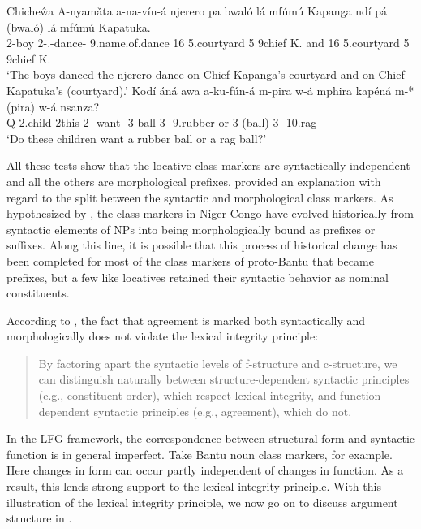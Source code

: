 \documentclass[output=paper,hidelinks]{langscibook}
\begin{document}
\ea\label{ex:African:12} Chiche\^wa
\ea
    \gll  A-nyamǎta a-na-vín-á njerero pa bwaló lá mfúmú Kapanga ndí
    pá (bwaló) lá mfúmú Kapatuka. \\
     2-boy            2{\SBJ}-{.\PST}-dance-{\IND}  9.name.of.dance
         16  5.courtyard 5 9chief     K.            and  16 5.courtyard
         5 9chief     K.   \\
    \glt ‘The boys danced the njerero dance on Chief Kapanga’s  courtyard and on Chief Kapatuka’s (courtyard).’
\ex
    \gll *Kodí áná awa a-ku-fún-á m-pira w-á mphira kapéná m-*(pira)
    w-á nsanza?\\
       Q      2.child   2this  2{\SBJ}-{\PROG}-want-{\IND}  3-ball    3-
            9.rubber or          3-(ball)      3- 10.rag \\
    \glt ‘Do these children want a rubber ball or a rag ball?’
\z
\z

All these tests show that the locative class markers are syntactically independent and all the others are morphological prefixes. \citet{bresnan1995the-lexical} provided an explanation with regard to the split between the syntactic and morphological class markers. As hypothesized by \citet{Greenberg1977,Greenberg:Gender}, the class markers in Niger-Congo have evolved historically from syntactic elements of NPs into being morphologically bound as prefixes or suffixes. Along this line, it is possible that this process of historical change has been completed for most of the class markers of proto-Bantu that became prefixes, but a few like locatives retained their syntactic behavior as nominal constituents. 

According to \citet{bresnan1995the-lexical}, the fact that agreement is marked both syntactically and morphologically does not violate the lexical integrity principle:

\begin{quote}
By factoring apart the syntactic levels of f-structure and c-structure, we can distinguish naturally between structure-dependent syntactic principles (e.g., constituent order), which respect lexical integrity, and function-depen\-dent syntactic principles (e.g., agreement), which do not. \citep[213]{bresnan1995the-lexical}
\end{quote}

In the LFG framework, the correspondence between structural form and syntactic function is in general imperfect. Take Bantu noun class markers, for example. Here changes in form can occur partly independent of changes in function. As a result, this lends strong support to the lexical integrity principle. With this illustration of the lexical integrity principle, we now go on to discuss argument structure in .
\end{document}
